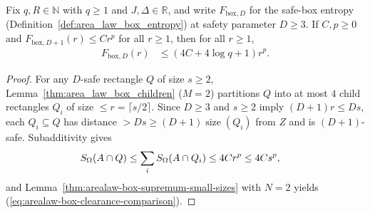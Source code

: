 \begin{lemma}
    \label{thm:arealaw-box-clearance-comparison}
    \leanok
    Fix $q,R\in\mathbb N$ with $q\geq1$ and $J,\Delta\in\mathbb R$, and write $F_{\mathrm{box},D}$
    for the safe-box entropy (Definition~\ref{def:area_law_box_entropy}) at safety parameter $D\ge3$.
    If $C,p\geq0$ and $F_{\mathrm{box},D+1}(r)\leq Cr^p$ for all $r\geq1$, then for all $r\geq1$,
    \begin{align}
        F_{\mathrm{box},D}(r) & \leq (4C+4\log q+1)r^p.
        \label{eq:arealaw-box-clearance-comparison}
    \end{align}
\end{lemma}
\begin{proof}\leanok
    For any $D$-safe rectangle $Q$ of size $s\geq2$, Lemma~\ref{thm:area_law_box_children} ($M=2$)
    partitions $Q$ into at most $4$ child rectangles $Q_i$ of size $\le r=\lceil s/2\rceil$.
    Since $D\ge3$ and $s\ge2$ imply $(D+1)r\le Ds$, each $Q_i\subseteq Q$ has distance $>Ds\ge(D+1)\operatorname{size}(Q_i)$
    from $Z$ and is $(D+1)$-safe. Subadditivity gives
    \begin{align}
        S_\Omega(A\cap Q) & \leq \sum_i S_\Omega(A\cap Q_i) \leq 4Cr^p \leq 4Cs^p,
        \notag
    \end{align}
    and Lemma~\ref{thm:arealaw-box-supremum-small-sizes} with $N=2$ yields (\ref{eq:arealaw-box-clearance-comparison}).
\end{proof}

